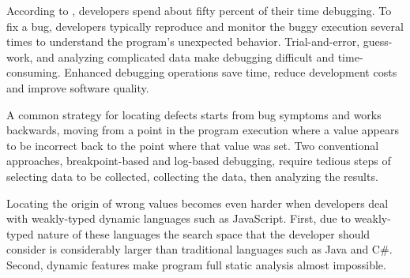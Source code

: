 \documentclass{sig-alternate}
\begin{document}
According to  \cite{LaToza}, developers spend about fifty percent of
their time debugging. To fix a bug, developers typically reproduce 
and monitor the buggy execution several times to understand the 
program's unexpected behavior. Trial-and-error, guess-work, and 
analyzing complicated data make debugging difficult and time-consuming. 
Enhanced debugging operations save  
time, reduce development costs and improve software quality.

A common strategy for locating defects starts from bug symptoms and
works backwards, moving from a point in the program execution where a
value appears to be incorrect back to the point where that value was
set.  Two conventional approaches, breakpoint-based and
log-based debugging, require tedious steps of
selecting data to be collected, collecting the data, then analyzing
the results. 



Locating the origin of wrong values becomes even harder when developers 
deal with weakly-typed dynamic languages such as JavaScript. First, due to weakly-typed
nature of these languages the search space that the developer should consider is considerably 
larger than traditional languages such as Java and C{\small\#}. Second, dynamic features make 
program full static analysis almost impossible.
\end{document}
